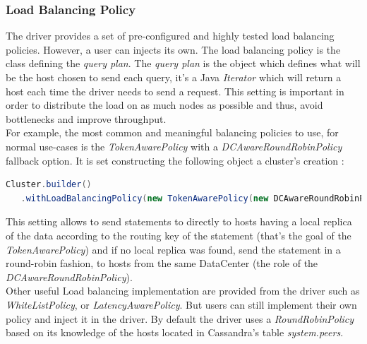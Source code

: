\documentclass[a4paper]{report}
\begin{document}
\subsubsection{Load Balancing Policy}
The driver provides a set of pre-configured and highly tested load balancing policies. However, a user can injects its own. The load balancing policy is the class defining the \emph{query plan}. The \emph{query plan} is the object which defines what will be the host chosen to send each query, it's a Java \emph{Iterator} which will return a host each time the driver needs to send a request. This setting is important in order to distribute the load on as much nodes as possible and thus, avoid bottlenecks and improve throughput.\\
For example, the most common and meaningful balancing policies to use, for normal use-cases is the \emph{TokenAwarePolicy} with a \emph{DCAwareRoundRobinPolicy} fallback option. 
It is set constructing the following object a cluster's creation :
\begin{lstlisting}[label=lbp-ex-1, caption=Creation of the cluster, language=Java]
Cluster.builder()
   .withLoadBalancingPolicy(new TokenAwarePolicy(new DCAwareRoundRobinPolicy, true));
\end{lstlisting}
This setting allows to send statements to directly to hosts having a local replica of the data according to the routing key of the statement (that's the goal of the \emph{TokenAwarePolicy}) and if no local replica was found, send the statement in a round-robin fashion, to hosts from the same DataCenter (the role of the \emph{DCAwareRoundRobinPolicy}).\\
Other useful Load balancing implementation are provided from the driver such as \emph{WhiteListPolicy}, or \emph{LatencyAwarePolicy}. But users can still implement their own policy and inject it in the driver. By default the driver uses a \emph{RoundRobinPolicy} based on its knowledge of the hosts located in Cassandra's table \emph{system.peers}.
\end{document}
